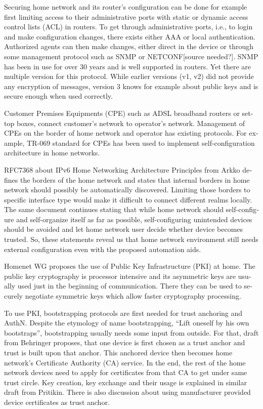 \documentclass[12pt,a4paper,english]{tutthesis}
\begin{document}
\begin{otherlanguage}{english}
Securing home network and its router's configuration can be done for
example first limiting access to their administrative ports
with static or dynamic access control lists (ACL) in
routers. To get through administrative ports, i.e., to login and make
configuration changes, there exists either AAA or local authentication.
Authorized agents can then make changes, either direct in the device or through some
management protocol such as SNMP or NETCONF[source needed?].  SNMP has been in
use for over 30 years and is well supported in routers. Yet there are
multiple version for this protocol. While earlier versions (v1, v2)
did not provide any encryption of messages, version 3 knows for example
about public keys and is secure enough when used correctly.


Customer Premises Equipments (CPE) such as ADSL broadband routers or
set-top boxes, connect customer's network to operator's network.
Management of CPEs on the border of home network and operator has 
existing protocols. For example, TR-069 standard\cite{iptvtr069} for CPEs
has been used to implement self-configuration archi\-tecture in
home networks\cite{tr069rachidi2011}.


RFC7368 about IPv6 Home Networking Architecture Principles from
Arkko\cite{rfc7368} defines the borders of the home network and states that
internal borders in home network should possibly be automatically
discovered. Limiting those borders to specific
interface type would make it difficult to connect different realms locally.
The same document continues stating
that while home network should self-configure and self-organize itself as
far as possible, self-configuring unintended devices should be
avoided and let home network user decide whether device becomes trusted.
So, these statements reveal us that home network environment still needs
external configuration even with the proposed automation aids.





Homenet WG proposes the use of Public Key Infrastructure (PKI) at 
home. The public key cryptography is processor intensive and its
asymmetric keys are usually used just in the beginning of
communication. There they can be used to securely negotiate symmetric
keys which allow faster cryptography processing.

To use PKI, bootstrapping protocols are first needed for trust
anchoring and AuthN.  Despite the etymology of name bootstrapping,
``Lift oneself by his own bootstraps'', bootstrapping usually needs
some input from outside.
For that, draft from Behringer\cite{draft-behringer-bootstrap} proposes,
that one device is first chosen as a trust anchor and trust is
built upon that anchor. This anchored device then becomes home network's
Certificate Authority (CA) service. In the end, the rest of the home network 
devices need to apply for certificates from that CA to get under same
trust circle.
Key creation, key exchange and their usage is explained in similar
draft from Pritikin\cite{draft-pritikin-bootstrap}. There is also discussion about using
manufacturer provided device certificates as trust anchor.  




\end{otherlanguage}
\end{document}
